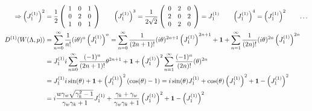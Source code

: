 \begin{widetext}
\begin{align*}
		\Rightarrow \left(J_1^{(1)}\right)^2&=\dfrac{1}{2}
		\left(\begin{array}{ccc}
			1&  0& 1 \\
			0&  2& 0 \\
			1&  0& 1
		\end{array}\right)\qquad
		\left(J_1^{(1)}\right)^3=\dfrac{1}{2\sqrt{2}}
		\left(\begin{array}{ccc}
			0&  2& 0 \\
			2&  0& 2 \\
			0&  2& 0
		\end{array}\right)=J_1^{(1)}
		\qquad
		\left(J_1^{(1)}\right)^4=\left(J_1^{(1)}\right)^2
		\qquad\dots\\
		D^{(1)}(W(\Lambda,p))&=\sum\limits_{n=0}^{\infty}\dfrac{1}{n!}(i\theta)^n \left(J_1^{(1)}\right)^n
		=\sum\limits_{n=0}^{\infty}\dfrac{1}{(2n+1)!}(i\theta)^{2n+1}\left(J_1^{(1)}\right)^{2n+1} + \mathbf{1} +\sum\limits_{n=1}^{\infty}\dfrac{1}{(2n)!}(i\theta)^{2n}\left(J_1^{(1)}\right)^{2n}\\
		&=J_1^{(1)} i \sum\limits_{n=0}^{\infty}\dfrac{(-1)^{n}}{(2n+1)!}\theta^{2n+1} + \mathbf{1} +\left(J_1^{(1)}\right)^{2}\sum\limits_{n=1}^{\infty}\dfrac{(-1)^{n}}{(2n)!}(\theta)^{2n}\\
		&=J_1^{(1)} i \sin(\theta) +\mathbf{1}+ \left(J_1^{(1)}\right)^{2}(\cos(\theta) -1)
		=i \sin(\theta) J_1^{(1)} +\cos(\theta) \left(J_1^{(1)}\right)^2 + \mathbf{1} - \left(J_1^{(1)}\right)^2\\
		&=i \dfrac{w\gamma_w\sqrt{\gamma_k^2-1}}{\gamma_w \gamma_k+1} J_1^{(1)} +\dfrac{\gamma_k+\gamma_w}{\gamma_w \gamma_k+1} \left(J_1^{(1)}\right)^2 + \mathbf{1} - \left(J_1^{(1)}\right)^2
	\end{align*}
\end{widetext}

